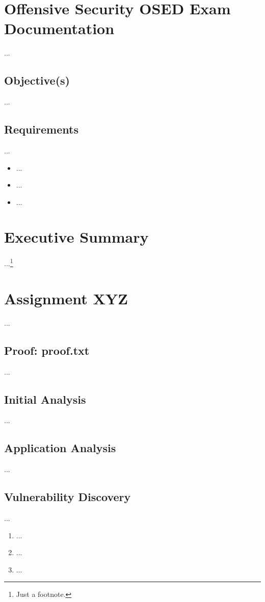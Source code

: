 %
%
%
\section{Offensive Security OSED Exam Documentation}\label{sec:sec1}
%
...
%
%
%
\subsection{Objective(s)}\label{sec:sec1-obj}
%
...
%
%
%
%
\subsection{Requirements}\label{sec:sec1-req}
%
...

\begin{itemize}
    \item ...
    \item ...
    \item ...
\end{itemize}
%
%
%
\section{Executive Summary}\label{sec:sec2}
%
...\footnote{Just a footnote.}
%
%
%
\section{Assignment XYZ}\label{sec:sec3}
%
...
%
%
%
\subsection{Proof: proof.txt}\label{sec:sec3-proof}
%
...
%
%
%
\subsection{Initial Analysis}\label{sec:sec3-init}
%
...
%
%
%
\subsection{Application Analysis}\label{sec:sec3-app}
%
...
%
%
%
\subsection{Vulnerability Discovery}\label{sec:sec3-vuln}
%
...

\begin{enumerate}
    \item ...
    \item ...
    \item ...
\end{enumerate}
%
%
%
